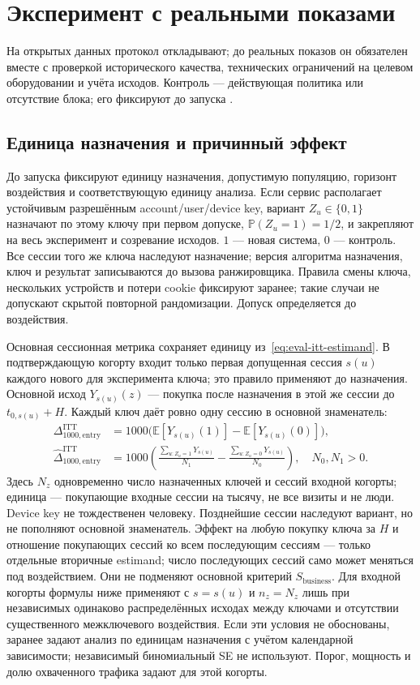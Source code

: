 \documentclass[12pt,a4paper]{article}
\newcommand{\E}{\mathbb E}
\newcommand{\Prob}{\mathbb P}
\theoremstyle{plainru}
\begin{document}
\section{Эксперимент с реальными показами}\label{sec:eval-online}

На открытых данных протокол откладывают; до реальных показов он
обязателен вместе с проверкой исторического качества, технических
ограничений на целевом оборудовании и учёта исходов. Контроль ---
действующая политика или отсутствие блока; его фиксируют
до запуска \cite{experiments}.

\subsection{Единица назначения и причинный эффект}\label{sec:eval-itt}

До запуска фиксируют единицу назначения, допустимую популяцию,
горизонт воздействия и соответствующую единицу анализа.
Если сервис располагает устойчивым разрешённым account/user/device key,
вариант $Z_u\in\{0,1\}$ назначают по этому ключу при первом допуске,
$\Prob(Z_u=1)=1/2$, и закрепляют на весь эксперимент и созревание исходов.
$1$ --- новая система, $0$ --- контроль. Все сессии того же ключа
наследуют назначение; версия алгоритма назначения, ключ и результат
записываются до вызова ранжировщика. Правила смены ключа, нескольких
устройств и потери cookie фиксируют заранее; такие случаи не допускают
скрытой повторной рандомизации. Допуск определяется до воздействия.

Основная сессионная метрика сохраняет единицу из~\eqref{eq:eval-itt-estimand}.
В подтверждающую когорту входит только первая допущенная сессия
$s(u)$ каждого нового для эксперимента ключа; это правило применяют
до назначения. Основной исход $Y_{s(u)}(z)$ --- покупка после назначения
в этой же сессии до $t_{0,s(u)}+H$. Каждый ключ даёт ровно одну
сессию в основной знаменатель:
\begin{align}\label{eq:eval-unit-itt}
\Delta_{1000,\mathrm{entry}}^{\mathrm{ITT}}
&=1000\bigl(\E[Y_{s(u)}(1)]-\E[Y_{s(u)}(0)]\bigr),\nonumber\\
\widehat\Delta_{1000,\mathrm{entry}}^{\mathrm{ITT}}
&=1000\left(\frac{\sum_{u:Z_u=1}Y_{s(u)}}{N_1}
             -\frac{\sum_{u:Z_u=0}Y_{s(u)}}{N_0}\right),\quad N_0,N_1>0.
\end{align}
Здесь $N_z$ одновременно число назначенных ключей и сессий входной
когорты; единица --- покупающие входные сессии на тысячу, не все визиты
и не люди. Device key не тождественен человеку. Позднейшие сессии
наследуют вариант, но не пополняют основной знаменатель. Эффект на
любую покупку ключа за $H$ и отношение покупающих сессий ко всем
последующим сессиям --- только отдельные вторичные estimand;
число последующих сессий само может меняться под воздействием.
Они не подменяют основной критерий $S_{\mathrm{business}}$.
Для входной когорты формулы ниже применяют с $s=s(u)$ и $n_z=N_z$
лишь при независимых одинаково распределённых исходах между ключами
и отсутствии существенного межключевого воздействия. Если эти условия
не обоснованы, заранее задают анализ по единицам назначения с учётом
календарной зависимости; независимый биномиальный SE не используют.
Порог, мощность и долю охваченного трафика задают для этой когорты.
\end{document}
